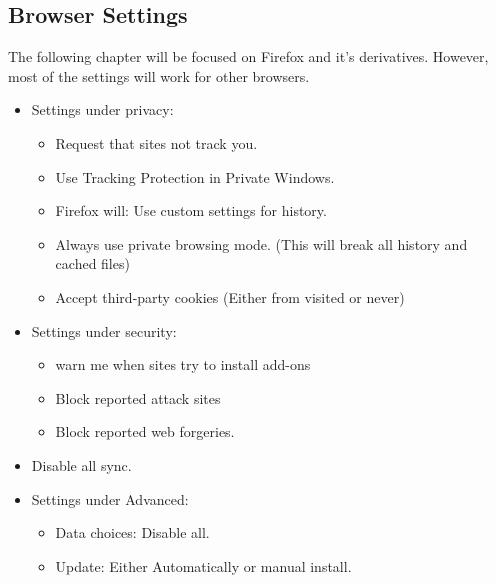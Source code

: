 \documentclass[a4paper,11pt]{report}
\begin{document}
		\subsection{Browser Settings}
			The following chapter will be focused on Firefox and it's derivatives. 
			However, most of the settings will work for other browsers. 
			\begin{itemize}
				\item Settings under privacy:
					\begin{itemize}
						\item Request that sites not track you. 
						\item Use Tracking Protection in Private Windows. 
						\item Firefox will: Use custom settings for history. 
						\item Always use private browsing mode. (This will break all history and cached files) 
						\item Accept third-party cookies (Either from visited or never)
					\end{itemize}
				\item Settings under security:
					\begin{itemize}
						\item warn me when sites try to install add-ons
						\item Block reported attack sites
						\item Block reported web forgeries. 
					\end{itemize}
				\item Disable all sync. 
				\item Settings under Advanced:
					\begin{itemize}
						\item Data choices: Disable all.
						\item Update: Either Automatically or manual install. 
					\end{itemize}
			\end{itemize}
\end{document}
